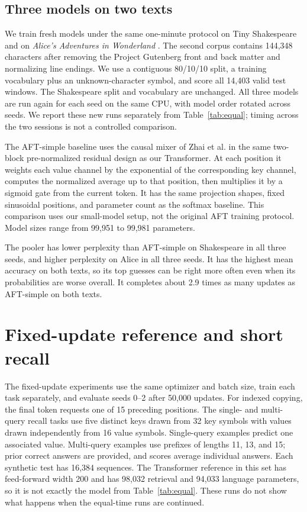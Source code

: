 \documentclass[11pt]{article}
\begin{document}
\subsection{Three models on two texts}
We train fresh models under the same one-minute protocol on Tiny Shakespeare and on \emph{Alice's Adventures in Wonderland} \cite{alice}. The second corpus contains 144,348 characters after removing the Project Gutenberg front and back matter and normalizing line endings. We use a contiguous 80/10/10 split, a training vocabulary plus an unknown-character symbol, and score all 14,403 valid test windows. The Shakespeare split and vocabulary are unchanged. All three models are run again for each seed on the same CPU, with model order rotated across seeds. We report these new runs separately from Table~\ref{tab:equal}; timing across the two sessions is not a controlled comparison.

The AFT-simple baseline uses the causal mixer of Zhai et al. in the same two-block pre-normalized residual design as our Transformer. At each position it weights each value channel by the exponential of the corresponding key channel, computes the normalized average up to that position, then multiplies it by a sigmoid gate from the current token. It has the same projection shapes, fixed sinusoidal positions, and parameter count as the softmax baseline. This comparison uses our small-model setup, not the original AFT training protocol. Model sizes range from 99,951 to 99,981 parameters.



\begin{samepage}
The pooler has lower perplexity than AFT-simple on Shakespeare in all three seeds, and higher perplexity on Alice in all three seeds. It has the highest mean accuracy on both texts, so its top guesses can be right more often even when its probabilities are worse overall. It completes about 2.9 times as many updates as AFT-simple on both texts.

\end{samepage}

\section{Fixed-update reference and short recall}
The fixed-update experiments use the same optimizer and batch size, train each task separately, and evaluate seeds 0--2 after 50,000 updates. For indexed copying, the final token requests one of 15 preceding positions. The single- and multi-query recall tasks use five distinct keys drawn from 32 key symbols with values drawn independently from 16 value symbols. Single-query examples predict one associated value. Multi-query examples use prefixes of lengths 11, 13, and 15; prior correct answers are provided, and scores average individual answers. Each synthetic test has 16,384 sequences. The Transformer reference in this set has feed-forward width 200 and has 98,032 retrieval and 94,033 language parameters, so it is not exactly the model from Table~\ref{tab:equal}. These runs do not show what happens when the equal-time runs are continued.
\end{document}
